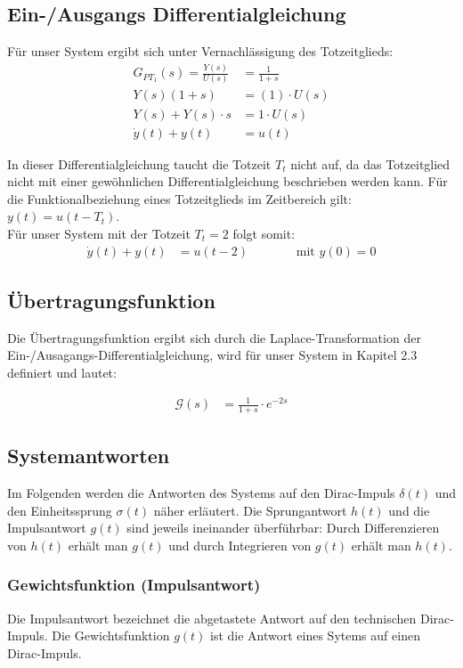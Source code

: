 \subsection{Ein-/Ausgangs Differentialgleichung}
Für unser System ergibt sich unter Vernachlässigung des Totzeitglieds:
\begin{align*}
G_{PT_1}(s) =\frac{Y(s)}{U(s)} &= \frac{1}{1 + s} \\
Y(s)(1+s) &= (1) \cdot U(s) \\
Y(s) + Y(s) \cdot s &= 1\cdot U(s) \\
\dot y(t) + y(t) &= u(t) 
\end{align*}

In dieser Differentialgleichung taucht die Totzeit $T_t$ nicht auf, da das Totzeitglied nicht mit einer gewöhnlichen Differentialgleichung beschrieben werden kann. Für die Funktionalbeziehung eines Totzeitglieds im Zeitbereich gilt: $y(t) = u(t-T_t)$. \\
Für unser System mit der Totzeit $T_t = 2$ folgt somit:
\begin{align*}
    \dot y(t) + y(t) &= u(t - 2) \enspace \enspace \enspace \enspace \enspace \enspace \enspace \text { mit } y(0) = 0
\end{align*}

\subsection{Übertragungsfunktion}
Die Übertragungsfunktion ergibt sich durch die Laplace-Transformation der Ein-/Ausagangs-Differentialgleichung, wird für unser System in Kapitel 2.3 definiert und lautet: 

\begin{align*}
    \mathcal{G}(s) &= \frac{1}{1 + s} \cdot e^{-2s} 
\end{align*}

\subsection{Systemantworten}
Im Folgenden werden die Antworten des Systems auf den Dirac-Impuls $\delta(t)$ und den Einheitssprung $\sigma (t)$ näher erläutert.
Die Sprungantwort $h(t)$ und die Impulsantwort $g(t)$ sind jeweils ineinander überführbar: Durch Differenzieren von $h(t)$ erhält man $g(t)$ und durch Integrieren von $g(t)$ erhält man $h(t)$.
\subsubsection{Gewichtsfunktion (Impulsantwort)}
Die Impulsantwort bezeichnet die abgetastete Antwort auf den technischen Dirac-Impuls.
Die Gewichtsfunktion $g(t)$ ist die Antwort eines Sytems auf einen Dirac-Impuls.

